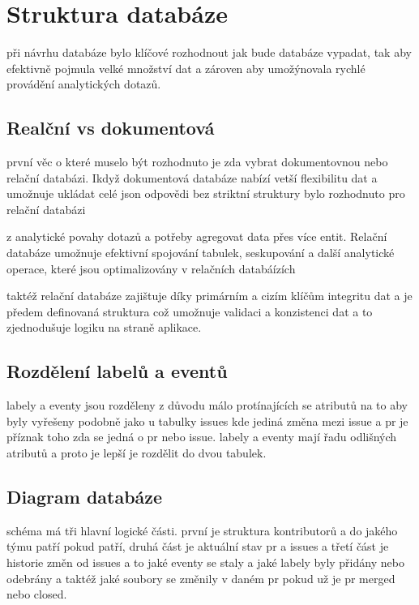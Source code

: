 \section{Struktura databáze}
\label{sec:database}

při návrhu databáze bylo klíčové rozhodnout jak bude databáze vypadat, tak aby efektivně pojmula velké množství dat a zároven aby umožýnovala rychlé provádění analytických dotazů.

\subsection{Realční vs dokumentová}
\label{subsec:database:relational_vs_document}
první věc o které muselo být rozhodnuto je zda vybrat dokumentovnou nebo relační databázi. Ikdyž dokumentová databáze nabízí vetší flexibilitu dat a umožnuje ukládat celé json odpovědi bez striktní struktury bylo rozhodnuto pro relační databázi

z analytické povahy dotazů a potřeby agregovat data přes více entit. Relační databáze umožnuje efektivní spojování tabulek, seskupování a další analytické operace, které jsou optimalizovány v relačních databáízích

taktéž relační databáze zajištuje díky primárním a cizím klíčům integritu dat a je předem definovaná struktura což umožnuje validaci a konzistenci dat a to zjednodušuje logiku na straně aplikace.


\subsection{Rozdělení labelů a eventů}
labely a eventy jsou rozděleny z důvodu málo protínajících se atributů na to aby byly vyřešeny podobně jako u tabulky issues kde jediná změna mezi issue a pr je příznak toho zda se jedná o pr nebo issue. labely a eventy mají řadu odlišných atributů a proto je lepší je rozdělit do dvou tabulek.

\subsection{Diagram databáze}

schéma má tři hlavní logické části. první je struktura kontributorů a do jakého týmu patří pokud patří, druhá část je aktuální stav pr a issues a třetí část je historie změn od issues a to jaké eventy se staly a jaké labely byly přidány nebo odebrány a taktéž jaké soubory se změnily v daném pr pokud už je pr merged nebo closed.

